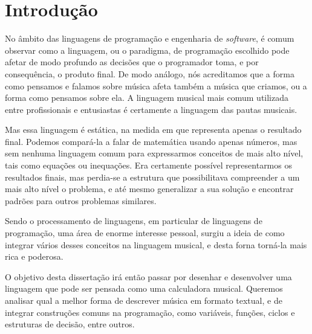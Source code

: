 \newcommand{\novathesis}{\emph{novathesis}}
\newcommand{\novathesisclass}{\texttt{novathesis.cls}}


\chapter{Introdução}
\label{cha:introducao}


No âmbito das linguagens de programação e engenharia de \textit{software}, é comum observar como a linguagem, ou o paradigma, de programação escolhido pode afetar de modo profundo as decisões que o programador toma, e por consequência, o produto final. De modo análogo, nós acreditamos que a forma como pensamos e falamos sobre música afeta também a música que criamos, ou a forma como pensamos sobre ela. A linguagem musical mais comum utilizada entre profissionais e entusiastas é certamente a linguagem das pautas musicais.

Mas essa linguagem é estática, na medida em que representa apenas o resultado final. Podemos compará-la a falar de matemática usando apenas números, mas sem nenhuma linguagem comum para expressarmos conceitos de mais alto nível, tais como equações ou inequações. Era certamente possível representarmos os resultados finais, mas perdia-se a estrutura que possibilitava compreender a um mais alto nível o problema, e até mesmo generalizar a sua solução e encontrar padrões para outros problemas similares.

Sendo o processamento de linguagens, em particular de linguagens de programação, uma área de enorme interesse pessoal, surgiu a ideia de como integrar vários desses conceitos na linguagem musical, e desta forna torná-la mais rica e poderosa.

O objetivo desta dissertação irá então passar por desenhar e desenvolver uma linguagem que pode ser pensada como uma calculadora musical. Queremos analisar qual a melhor forma de descrever música em formato textual, e de integrar construções comuns na programação, como variáveis, funções, ciclos e estruturas de decisão, entre outros.

